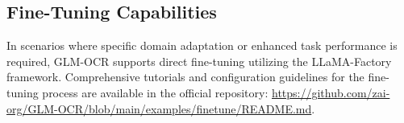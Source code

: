 \subsection{Fine-Tuning Capabilities}
In scenarios where specific domain adaptation or enhanced task performance is required, GLM-OCR supports direct fine-tuning utilizing the LLaMA-Factory framework. Comprehensive tutorials and configuration guidelines for the fine-tuning process are available in the official repository: \url{https://github.com/zai-org/GLM-OCR/blob/main/examples/finetune/README.md}.